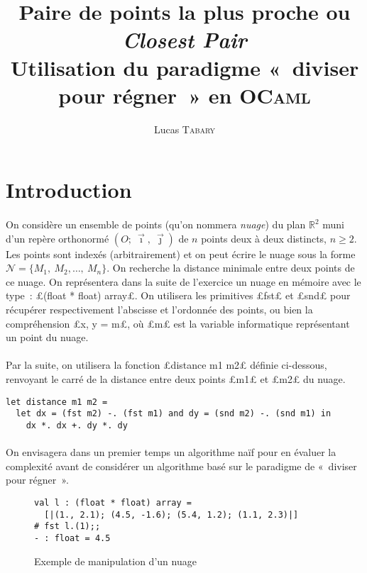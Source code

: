 \documentclass{article}
\title{Paire de points la plus proche ou \textit{Closest Pair} \\
\large Utilisation du paradigme «~diviser pour régner~» en \textsc{OCaml}}
\author{Lucas \textsc{Tabary}}
\date{}
\begin{document}
  \maketitle

  \section{Introduction}
  \paragraph{} On considère un ensemble de points (qu'on nommera \textit{nuage}) du plan $\mathbb{R}^2$ muni d'un repère orthonormé $(O;\ \vec\imath,\ \vec\jmath)$ de $n$ points deux à deux distincts, $n \geqslant 2$. Les points sont indexés (arbitrairement) et on peut écrire le nuage sous la forme $\mathcal{N} = \{M_1,\ M_2,\dots,\ M_n\}$. On recherche la distance minimale entre deux points de ce nuage. On représentera dans la suite de l'exercice un nuage en mémoire avec le type~: £(float * float) array£. On utilisera les primitives £fst£ et £snd£ pour récupérer respectivement l'abscisse et l'ordonnée des points, ou bien la compréhension £x, y = m£, où £m£ est la variable informatique représentant un point du nuage.

  \paragraph{} Par la suite, on utilisera la fonction £distance m1 m2£ définie ci-dessous, renvoyant le carré de la distance entre deux points £m1£ et £m2£ du nuage.
  \begin{lstlisting}
let distance m1 m2 =
  let dx = (fst m2) -. (fst m1) and dy = (snd m2) -. (snd m1) in
    dx *. dx +. dy *. dy
  \end{lstlisting}

  \paragraph{} On envisagera dans un premier temps un algorithme naïf pour en évaluer la complexité avant de considérer un algorithme basé sur le paradigme de «~diviser pour régner~».

  \begin{figure}[h]
    \begin{lstlisting}
val l : (float * float) array =
  [|(1., 2.1); (4.5, -1.6); (5.4, 1.2); (1.1, 2.3)|]
# fst l.(1);;
- : float = 4.5
    \end{lstlisting}
    \caption{Exemple de manipulation d'un nuage}
  \end{figure}
\end{document}
